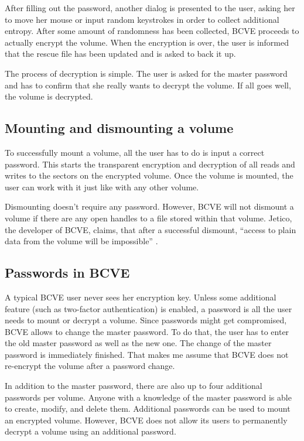 \documentclass[thesis=B,english]{FITthesis}[2012/10/20]
\begin{document}
	After filling out the password, another dialog is presented to the user, asking her to move her mouse or input random keystrokes in order to collect additional entropy. After some amount of randomness has been collected, BCVE proceeds to actually encrypt the volume. When the encryption is over, the user is informed that the rescue file has been updated and is asked to back it up. 
	
	The process of decryption is simple. The user is asked for the master password and has to confirm that she really wants to decrypt the volume. If all goes well, the volume is decrypted.
	
	\subsection{Mounting and dismounting a volume}
	
	To successfully mount a volume, all the user has to do is input a correct password. This starts the transparent encryption and decryption of all reads and writes to the sectors on the encrypted volume. Once the volume is mounted, the user can work with it just like with any other volume. 
	
	Dismounting doesn't require any password. However, BCVE will not dismount a volume if there are any open handles to a file stored within that volume. Jetico, the developer of BCVE, claims, that after a successful dismount, ``access to plain data from the volume will be impossible'' \cite{bcve_help}.
	
	\subsection{Passwords in BCVE}
	
	A typical BCVE user never sees her encryption key. Unless some additional feature (such as two-factor authentication) is enabled, a password is all the user needs to mount or decrypt a volume. Since passwords might get compromised, BCVE allows to change the master password. To do that, the user has to enter the old master password as well as the new one. The change of the master password is immediately finished. That makes me assume that BCVE does not re-encrypt the volume after a password change. 
	
	In addition to the master password, there are also up to four additional passwords per volume. Anyone with a knowledge of the master password is able to create, modify, and delete them. Additional passwords can be used to mount an encrypted volume. However, BCVE does not allow its users to permanently decrypt a volume using an additional password.
	
\end{document}
